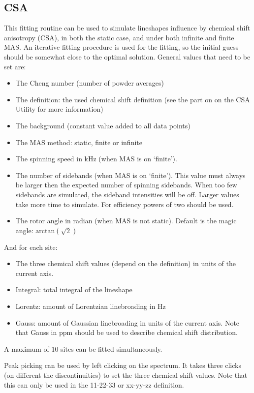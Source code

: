 \documentclass[11pt,a4paper]{article}
\begin{document}
\subsection{CSA}
This fitting routine can be used to simulate lineshapes influence by chemical shift anisotropy
(CSA), in both the static case, and under both infinite and finite MAS. An iterative fitting
procedure is used for the fitting, so the initial guess should be somewhat close to the optimal
solution. General values that need to be set are:
\begin{itemize}
\item The Cheng number (number of powder averages)
\item The definition: the used chemical shift definition (see the part on on the CSA Utility for more information)
\item The background (constant value added to all data points)
\item The MAS method: static, finite or infinite
\item The spinning speed in kHz (when MAS is on `finite').
\item The number of sidebands (when MAS is on `finite'). This value must always be larger then the
  expected number of spinning sidebands. When too few sidebands are simulated, the sideband intensities will be off. 
Larger values take more time to simulate. For efficiency powers of two should be used.
\item The rotor angle in radian (when MAS is not static). Default is the magic angle:
	 $\text{arctan}(\sqrt{2})$
\end{itemize}
And for each site:
\begin{itemize}
\item The three chemical shift values (depend on the definition) in units of the current axis.
\item Integral: total integral of the lineshape
\item Lorentz: amount of Lorentzian linebroading in Hz
\item Gauss: amount of Gaussian linebroading in units of the current axis. Note that Gauss in ppm should be used to 
            describe chemical shift distribution.
\end{itemize}
A maximum of 10 sites can be fitted simultaneously.

Peak picking can be used by left clicking on the spectrum. It takes three clicks (on different the
discontinuities) to set the three chemical shift values. Note that this can only be used in the 11-22-33 or
xx-yy-zz definition.
\end{document}
